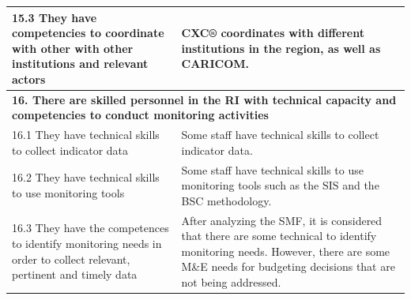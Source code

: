 \documentclass[
  10pt,
]{book}
\begin{document}
\begin{table}
\begin{tabular}[t]{l|l}
\hline
\hspace{1em}15.3 They have competencies to coordinate with other with other institutions and relevant actors & CXC® coordinates with different institutions in the region, as well as CARICOM.\\
\hline
\multicolumn{2}{l}{\textbf{16. There are skilled personnel in the RI with technical capacity and competencies to conduct monitoring activities}}\\
\hline
\hspace{1em}16.1 They have technical skills to collect indicator data & Some staff have technical skills to collect indicator data.\\
\hline
\hspace{1em}16.2 They have technical skills to use monitoring tools & Some staff have technical skills to use monitoring tools such as the SIS and the BSC methodology.\\
\hline
\hspace{1em}16.3 They have the competences to identify monitoring needs in order to collect relevant, pertinent and timely data & After analyzing the SMF, it is considered that there are some technical to identify monitoring needs. However, there are some M\&E needs for budgeting decisions that are not being addressed.\\
\hline
\end{tabular}
\end{table}
\end{document}
